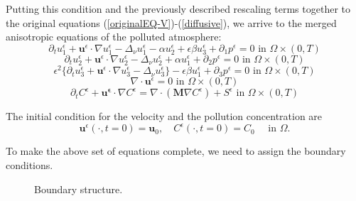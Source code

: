 \documentclass[11pt]{article}
\begin{document}
Putting this condition and the previously described rescaling terms together to the original equations (\ref{originalEQ-V})-(\ref{diffusive}), we arrive to the merged anisotropic equations of the polluted atmosphere:
%
\begin{equation} \label{ANSC1}
\partial_t u^\epsilon _1 + \mathbf{u}^\epsilon \cdot \nabla u^\epsilon _1 -\Delta_\nu u^\epsilon _1 -\alpha u_2^\epsilon + \epsilon \beta u_3^\epsilon + \partial_1 p^\epsilon = 0 \text{ in } \Omega \times (0,T)
\end{equation}
%
\begin{equation} \label{ANSC2}
\partial_t u_2^\epsilon + \mathbf{u}^\epsilon \cdot \nabla u_2^\epsilon -\Delta_\nu u_2^\epsilon + \alpha u_1^\epsilon + \partial_2 p^\epsilon = 0 \text{ in } \Omega \times (0,T)
\end{equation}
%
\begin{equation} \label{ANSC3}
\epsilon^2 \{ \partial_t u_3^\epsilon + \mathbf{u}^\epsilon \cdot \nabla u_3^\epsilon -\Delta_\nu u_3^{\epsilon} \} - \epsilon \beta u_1^\epsilon + \partial_3 p^\epsilon = 0 \text{ in } \Omega \times (0,T)
\end{equation}
%
\begin{equation} \label{ANSC4}
\nabla \cdot \mathbf{u}^\epsilon= 0 \text{ in } \Omega \times (0,T)
\end{equation}
%
\begin{equation} \label{ANSC5}
\partial_t C^\epsilon + \mathbf{u^\epsilon} \cdot \nabla C^\epsilon = \nabla \cdot (\mathbf{M} \nabla C^\epsilon) + S^\epsilon \text{ in } \Omega \times (0,T)
\end{equation} 

The initial condition for the velocity and the pollution concentration are
\begin{equation} \label{ANSC_init}
\mathbf{u}^\epsilon (\cdot, t = 0) = \mathbf{u}_0, \quad C^\epsilon (\cdot, t=0) = C_0 \quad \text{ in } \Omega.
\end{equation}

To make the above set of equations complete, we need to assign the boundary conditions.

\begin{figure}[!h]
\centering
{}
\caption{Boundary structure.}
\label{Fig1}
\end{figure}
\end{document}
